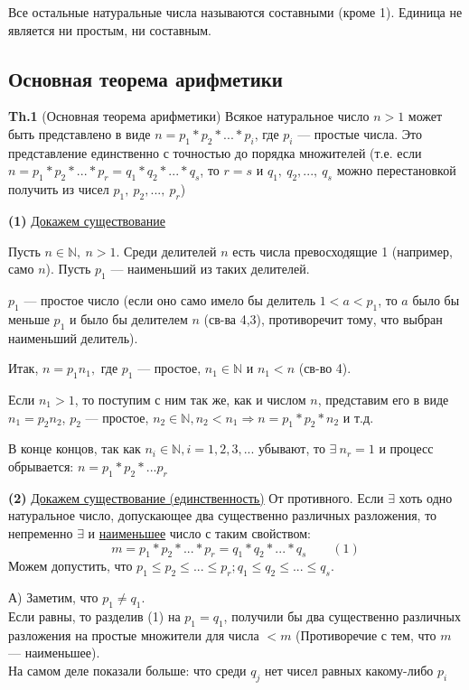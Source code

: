 \documentclass{article}
\begin{document}
  			Все остальные натуральные числа называются составными (кроме 1). Единица не является ни простым, ни составным.
            
        \subsection{Основная теорема арифметики}
        	\textbf{Th.1} (Основная теорема арифметики) Всякое натуральное число \( n > 1 \) может быть представлено в виде \( n = p_1*p_2* ... *p_i \), где \( p_i \) --- простые числа. Это представление единственно с точностью до порядка множителей (т.е. если \( n = p_1*p_2*...*p_r = q_1*q_2*...*q_s \), то \( r = s \) и \(q_1,\ q_2,...,\ q_s \) можно перестановкой получить из чисел \( p_1,\ p_2,...,\ p_r \))

            \textbf{(1)} \underline{Докажем существование} 

            Пусть \(n \in \mathbb{N},\ n > 1 \). Среди делителей \( n \) есть числа превосходящие 1 (например, само \( n \)). Пусть \( p_1 \) --- наименьший из таких делителей.

            \( p_1 \) --- простое число (если оно само имело бы делитель \( 1 < a < p_1 \), то \( a \) было бы меньше \( p_1 \) и было бы делителем \( n \) (св-ва 4,3), противоречит тому, что выбран наименьший делитель).

            Итак, \( n = p_1n_1, \textrm{ где } p_1 \textrm{ --- простое, } n_1 \in \mathbb{N} \textrm{ и } n_1 < n \) (св-во 4).

            Если \( n_1 > 1 \), то поступим с ним так же, как и числом \( n \), представим его в виде \( n_1 = p_2n_2 \), \( p_2 \) --- простое, \( n_2 \in \mathbb{N}, n_2 < n_1 \Rightarrow n = p_1*p_2*n_2 \) и т.д.

            В конце концов, так как \( n_i \in \mathbb{N}, i=1,2,3,... \) убывают, то \( \exists\ n_r = 1 \) и процесс обрывается: \( n=p_1*p_2*...p_r \)

            \textbf{(2)} \underline{Докажем существование (единственность)}
            От противного. Если \( \exists \) хоть одно натуральное число, допускающее два существенно различных разложения, то непременно \( \exists \) и \underline{наименьшее} число с таким свойством: \[ m = p_1*p_2*...*p_r = q_1*q_2*...*q_s \qquad (1) \]
            Можем допустить, что \( p_1 \leq p_2 \leq ... \leq p_r; q_1 \leq q_2 \leq ... \leq q_s \).

            А) Заметим, что \( p_1 \neq q_1 \).\\
            Если равны, то разделив (1) на \( p_1 = q_1 \), получили бы два существенно различных разложения на простые множители для числа \( < m \) (Противоречие с тем, что \( m \) --- наименьшее).\\
            На самом деле показали больше: что среди \( q_j \) нет чисел равных какому-либо \( p_i \)
\end{document}
